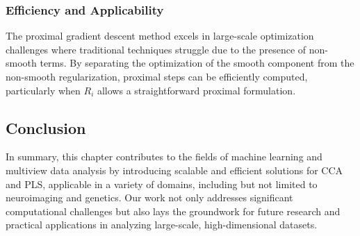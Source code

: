 \subsubsection{Efficiency and Applicability}

The proximal gradient descent method excels in large-scale optimization challenges where traditional techniques struggle due to the presence of non-smooth terms. By separating the optimization of the smooth component from the non-smooth regularization, proximal steps can be efficiently computed, particularly when $R_i$ allows a straightforward proximal formulation.

\subsection{Conclusion}

In summary, this chapter contributes to the fields of machine learning and multiview data analysis by introducing scalable and efficient solutions for CCA and PLS, applicable in a variety of domains, including but not limited to neuroimaging and genetics.
Our work not only addresses significant computational challenges but also lays the groundwork for future research and practical applications in analyzing large-scale, high-dimensional datasets.